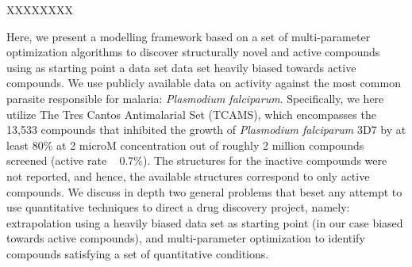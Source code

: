 \documentclass[journal=jacsat,manuscript=article]{achemso}
\begin{document}
XXXXXXXX\cite{Wallach2018}


Here, we present a modelling framework based on a set of multi-parameter optimization algorithms to discover structurally novel and active compounds 
using as starting point a data set data set heavily biased towards active compounds.
We use publicly available data on activity against the most common parasite responsible for malaria: \textit{Plasmodium falciparum}. 
Specifically, we here utilize The Tres Cantos Antimalarial Set (TCAMS), which encompasses the 13,533 compounds that inhibited the growth of \textit{Plasmodium falciparum} 3D7 by at least 80\% at 2 microM concentration out of roughly 2 million compounds screened (active rate ~ 0.7\%)\cite{Gamo2010}. The structures for the inactive compounds were not reported, and hence, the available structures correspond to only active compounds.
We discuss in depth two general problems that beset any attempt to use quantitative techniques to direct a drug discovery project, namely: extrapolation using a heavily biased data set as starting point (in our case biased towards active compounds), and multi-parameter optimization to identify compounds satisfying a set of quantitative conditions.
\newline
\newline
\end{document}
